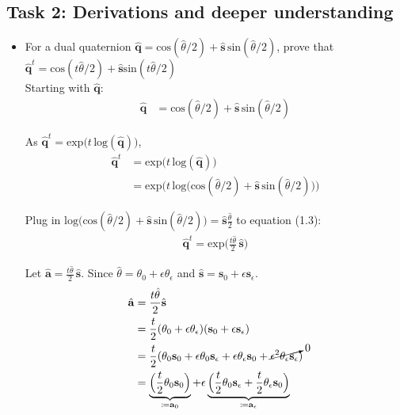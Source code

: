\documentclass[paper=a4, fontsize=11pt]{scrartcl} %
\numberwithin{equation}{section} %
\numberwithin{figure}{section} %
\numberwithin{table}{section} %
\renewcommand{\vec}[1]{\mathbf{#1}}
\begin{document}
\subsection{Task 2: Derivations and deeper understanding}

\begin{itemize}
	\item For a dual quaternion $\hat{\vec{q}} = \text{cos} (\hat{\theta} /2) + \hat{\vec{s}} \, \text{sin} (\hat{\theta} /2)$, prove that $\hat{\vec{q}}^t = \text{cos} (t\hat{\theta} /2) + \hat{\vec{s}} \text{sin} (t\hat{\theta} /2)$ \\
	
	Starting with $\hat{\vec{q}}$:
	\begin{align}
		\hat{\vec{q}} &= \text{cos} (\hat{\theta} /2) + \hat{\vec{s}} \,\text{sin} (\hat{\theta} /2)
	\end{align}

	As $\hat{\vec{q}}^t	= \text{exp} \big(t \, \text{log}(\hat{\vec{q}}) \big)$, 
	\begin{align}
		\hat{\vec{q}}^t	&= \text{exp} \big( t \, \text{log}(\hat{\vec{q}}) \big) \\
						&= \text{exp}\Big(t \, \text{log} \big(\text{cos} (\hat{\theta} /2) + \hat{\vec{s}} \,\text{sin} (\hat{\theta} /2) \big) \Big)
	\end{align}

	Plug in $\text{log} \big(\text{cos} (\hat{\theta} /2) + \hat{\vec{s}} \,\text{sin} (\hat{\theta} /2) \big) = \hat{\vec{s}} \frac{\hat{\theta}}{2}$ to equation (1.3):
	\begin{align}
		\hat{\vec{q}}^t = \text{exp}\Big( \frac{t\hat{\theta}}{2} \,\hat{\vec{s}} \Big)
	\end{align}
	
	Let $\hat{\vec{a}} = \frac{t\hat{\theta}}{2} \,\hat{\vec{s}}$. Since $\hat{\theta} = \theta_0 + \epsilon \theta_\epsilon$ and $\hat{\vec{s}} = \vec{s}_0 + \epsilon\vec{s}_\epsilon$.
	\begin{align}
		\hat{\vec{a}} &= \frac{t\hat{\theta}}{2} \hat{\vec{s}} \\
		&= \frac{t}{2}(\theta_0 + \epsilon \theta_\epsilon)(\vec{s}_0 + \epsilon\vec{s}_\epsilon) \\
		&= \frac{t}{2} (\theta_0\vec{s}_0 + \epsilon \theta_0 \vec{s}_\epsilon + \epsilon \theta_\epsilon \vec{s}_0 + \cancelto{0}{\epsilon^2 \theta_\epsilon \vec{s}_\epsilon}) \\
		&= \underbrace{ \Big( \frac{t}{2} \theta_0\vec{s}_0 \Big) }_{\coloneqq \vec{a}_0} 
			+ \epsilon \underbrace{ \Big( \frac{t}{2} \theta_0 \vec{s}_\epsilon + \frac{t}{2} \theta_\epsilon \vec{s}_0 \Big) }_{\coloneqq \vec{a}_\epsilon }
	\end{align}
	

\end{itemize}
\end{document}
